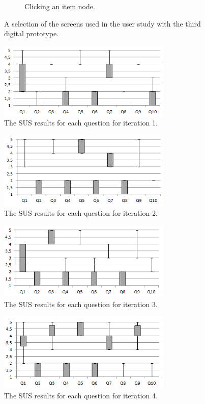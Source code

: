 \documentclass[a4paper,10pt,twocolumn]{article}
\begin{document}
\begin{appendices}
\begin{figure}
\begin{subfigure}[t]{0.3\textwidth}
						\caption{Clicking an item node.}
						\label{figure:prototype_soundsuggest3_item_click}
		\end{subfigure}
		\caption{A selection of the screens used in the user study with the third digital prototype.}%
		\label{figure:prototype_soundsuggest3}%
	\end{figure}
	
	\begin{figure}
		\includegraphics[width=8.3cm]{img/iterations_sus_scores_it1_boxplots}
		\caption{The SUS results for each question for iteration 1.}
		\label{fig:iterations_sus_scores_it1_boxplots}
	\end{figure}

	\begin{figure}
		\includegraphics[width=8.3cm]{img/iterations_sus_scores_it2_boxplots}
		\caption{The SUS results for each question for iteration 2.}
		\label{fig:iterations_sus_scores_it2_boxplots}
	\end{figure}

	\begin{figure}
		\includegraphics[width=8.3cm]{img/iterations_sus_scores_it3_boxplots}
		\caption{The SUS results for each question for iteration 3.}
		\label{fig:iterations_sus_scores_it3_boxplots}
	\end{figure}

	\begin{figure}
		\includegraphics[width=8.3cm]{img/iterations_sus_scores_it4_boxplots}
		\caption{The SUS results for each question for iteration 4.}
		\label{fig:iterations_sus_scores_it4_boxplots}
	\end{figure}
	
\end{appendices}
\end{document}
